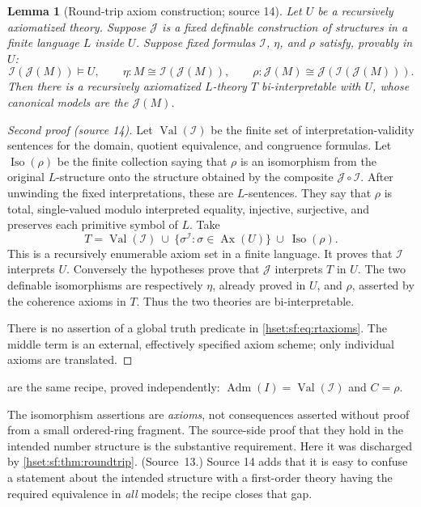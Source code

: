 \documentclass[11pt,letterpaper]{article}
\newtheorem{lemma}[lemma]{Lemma}\aliascntresetthe{lemma}
\theoremstyle{definition}
\theoremstyle{remark}
\newcommand{\I}{\mathcal I}
\newcommand{\J}{\mathcal J}
\begin{document}
\begin{lemma}[Round-trip axiom construction; source 14]\label{hset:sf:lem:rt}
Let $U$ be a recursively axiomatized theory. Suppose $\J$ is a fixed definable
construction of structures in a finite language $L$ inside $U$. Suppose fixed
formulas $\I$, $\eta$, and $\rho$ satisfy, provably in $U$:
\[
 \I(\J(M))\models U,\qquad \eta:M\cong \I(\J(M)),\qquad
 \rho:\J(M)\cong \J(\I(\J(M))).
\]
Then there is a recursively axiomatized $L$-theory $T$ bi-interpretable with $U$,
whose canonical models are the $\J(M)$.
\end{lemma}
\begin{proof}[Second proof (source 14)]
Let $\operatorname{Val}(\I)$ be the finite set of interpretation-validity
sentences for the domain, quotient equivalence, and congruence formulas. Let
$\operatorname{Iso}(\rho)$ be the finite collection saying that $\rho$ is an
isomorphism from the original $L$-structure onto the structure obtained by the
composite $\J\circ\I$. After unwinding the fixed interpretations, these are
$L$-sentences. They say that $\rho$ is total, single-valued modulo interpreted
equality, injective, surjective, and preserves each primitive symbol of $L$. Take
\begin{equation}\label{hset:sf:eq:rtaxioms}
 T=\operatorname{Val}(\I)\ \cup\ \{\sigma^\I:\sigma\in\operatorname{Ax}(U)\}\ \cup\ \operatorname{Iso}(\rho).
\end{equation}
This is a recursively enumerable axiom set in a finite language. It proves that
$\I$ interprets $U$. Conversely the hypotheses prove that $\J$ interprets $T$ in
$U$. The two definable isomorphisms are respectively $\eta$, already proved in $U$,
and $\rho$, asserted by the coherence axioms in $T$. Thus the two theories are
bi-interpretable.

There is no assertion of a global truth predicate in \eqref{hset:sf:eq:rtaxioms}.
The middle term is an external, effectively specified axiom scheme; only
individual axioms are translated.
\end{proof}

 are the same recipe, proved
independently: $\operatorname{Adm}(I)=\operatorname{Val}(\I)$ and $C=\rho$.

The isomorphism assertions are \emph{axioms}, not consequences asserted without
proof from a small ordered-ring fragment. The source-side proof that they hold in
the intended number structure is the substantive requirement. Here it was
discharged by \cref{hset:sf:thm:roundtrip}. (Source~13.) Source 14 adds that it
is easy to confuse a statement about the intended structure with a first-order
theory having the required equivalence in \emph{all} models; the recipe closes
that gap.
\end{document}
